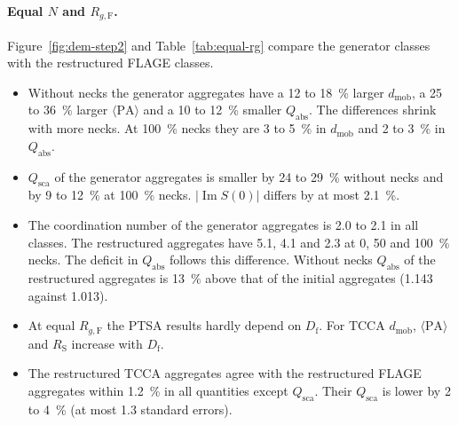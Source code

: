 \documentclass[11pt,a4paper]{article}
\newcommand{\Df}{D_\text{f}}
\begin{document}
\paragraph{Equal $N$ and $R_{g,\text{F}}$.}
Figure~\ref{fig:dem-step2} and Table~\ref{tab:equal-rg} compare the generator classes with the restructured FLAGE classes.
\begin{itemize}
  \item Without necks the generator aggregates have a 12 to \SI{18}{\percent} larger $d_\text{mob}$, a 25 to \SI{36}{\percent} larger $\langle\text{PA}\rangle$ and a 10 to \SI{12}{\percent} smaller $Q_\text{abs}$.
        The differences shrink with more necks.
        At \SI{100}{\percent} necks they are 3 to \SI{5}{\percent} in $d_\text{mob}$ and 2 to \SI{3}{\percent} in $Q_\text{abs}$.
  \item $Q_\text{sca}$ of the generator aggregates is smaller by 24 to \SI{29}{\percent} without necks and by 9 to \SI{12}{\percent} at \SI{100}{\percent} necks.
        $\lvert\operatorname{Im} S(0)\rvert$ differs by at most \SI{2.1}{\percent}.
  \item The coordination number of the generator aggregates is 2.0 to 2.1 in all classes.
        The restructured aggregates have 5.1, 4.1 and 2.3 at 0, 50 and \SI{100}{\percent} necks.
        The deficit in $Q_\text{abs}$ follows this difference.
        Without necks $Q_\text{abs}$ of the restructured aggregates is \SI{13}{\percent} above that of the initial aggregates (1.143 against 1.013).
  \item At equal $R_{g,\text{F}}$ the PTSA results hardly depend on $\Df$.
        For TCCA $d_\text{mob}$, $\langle\text{PA}\rangle$ and $R_\text{S}$ increase with $\Df$.
  \item The restructured TCCA aggregates agree with the restructured FLAGE aggregates within \SI{1.2}{\percent} in all quantities except $Q_\text{sca}$.
        Their $Q_\text{sca}$ is lower by 2 to \SI{4}{\percent} (at most 1.3 standard errors).
\end{itemize}
\end{document}
